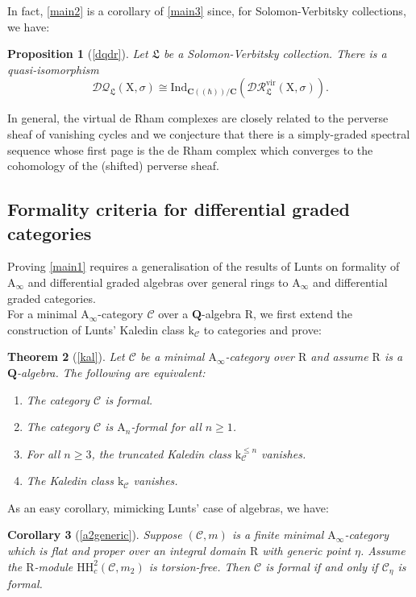 \documentclass{article}
\theoremstyle{plain}
\newtheorem{theorem}{Theorem}[subsection]   %
\newtheorem{corollary}[theorem]{Corollary}
\newtheorem{proposition}[theorem]{Proposition}
\theoremstyle{definition}
\theoremstyle{remark}
\newcommand{\mr}{\mathrm}
\newcommand{\Aa}{\mr{A}_{\infty}}
\newcommand{\Q}{\mathbf Q}
\newcommand{\C}{\mathbf C}
\newcommand{\Cc}{\mathcal C}
\newcommand{\cbrak}{(\!(\hbar)\!)}
\newcommand{\3}{\vspace{3mm}}
\newcommand{\2}{\vspace{2mm}}
\newcommand{\1}{\vspace{1mm}}
\begin{document}
In fact, \cref{main2} is a corollary of \cref{main3} since, for Solomon-Verbitsky collections, we have:
\2
\begin{proposition}[\cref{dqdr}]
Let $\mathfrak{L}$ be a Solomon-Verbitsky collection. There is a quasi-isomorphism $$\mathcal{DQ}_\mathfrak{L}(\mr{X},\sigma)\cong \mr{Ind}_{\C\cbrak/\C}\left(\mathcal{DR}^\mr{vir}_\mathfrak{L}(\mr{X},\sigma)\right).$$
\end{proposition}
In general, the virtual de Rham complexes are closely related to the perverse sheaf of vanishing cycles and we conjecture that there is a simply-graded spectral sequence whose first page is the de Rham complex which converges to the cohomology of the (shifted) perverse sheaf. 
\subsection{Formality criteria for differential graded categories}
Proving \cref{main1} requires a generalisation of the results of Lunts on formality of $\Aa$ and differential graded algebras over general rings to $\Aa$ and differential graded categories.\\
For a minimal $\Aa$-category $\Cc$ over a $\Q$-algebra $\mr{R}$, we first extend the construction of Lunts' Kaledin class $\mr{k}_\Cc$ to categories and prove:
\2
\begin{theorem}[\cref{kal}]
Let $\mathcal{C}$ be a minimal $\Aa$-category over $\mr{R}$ and assume $\mr{R}$ is a $\Q$-algebra. The following are equivalent:
\begin{enumerate}
\item The category $\mathcal{C}$ is formal.
\item The category $\mathcal{C}$ is $\mr{A}_n$-formal for all $n\ge 1$.
\item For all $n\ge 3$, the truncated Kaledin class $\mr{k}^{\le n}_\mathcal{C}$ vanishes.
\item The Kaledin class $\mr{k}_\mathcal{C}$ vanishes.
\end{enumerate}
\end{theorem}
As an easy corollary, mimicking Lunts' case of algebras, we have:
\2
\begin{corollary}[\cref{a2generic}]
Suppose $(\Cc,m)$ is a finite minimal $\Aa$-category which is flat and proper over an integral domain $\mr{R}$ with generic point $\eta$. Assume the $\mr{R}$-module $\mr{HH}^2_c(\Cc,m_2)$ is torsion-free. Then $\Cc$ is formal if and only if $\Cc_\eta$ is formal.
\end{corollary}
\end{document}
